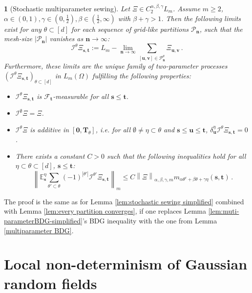 \documentclass[11pt,oneside,english,reqno]{amsart}
\numberwithin{equation}{section}
\numberwithin{figure}{section}
\theoremstyle{plain}
\theoremstyle{definition}
\theoremstyle{remark}
\theoremstyle{plain}
\newtheorem{lem}[thm]{\protect\lemmaname}
\theoremstyle{plain}
\theoremstyle{plain}
\theoremstyle{plain}
\theoremstyle{plain}
\providecommand{\lemmaname}{Lemma}
\newcommand{\cF}{\mathcal{F}}
\newcommand{\cI}{\mathcal{I}}
\newcommand{\cP}{\mathcal{P}}
\newcommand{\EE}{\mathbb{E}}
\newcommand{\bn}{\mathbf{n}}
\newcommand{\bT}{\mathbf{T}}
\newcommand{\boo}{\mathbf{0}}
\newcommand{\bu}{\mathbf{u}}
\newcommand{\bv}{\mathbf{v}}
\newcommand{\bs}{\mathbf{s}}
\newcommand{\bt}{\mathbf{t}}
\newcommand{\norm}[1]{\left\lVert #1\right\rVert}
\newcommand{\abs}[1]{\left\lvert #1\right\rvert}
\begin{document}
\begin{lem}[Stochastic multiparameter sewing]\label{lem:StochSewing}
Let $\Xi\in C_2^{\alpha,\beta,\gamma} L_m$. Assume $m\ge 2$, $\alpha\in(0,1),\gamma\in(0,\frac 12), \beta\in(\frac 12,\infty)$ with $\beta+\gamma>1$. Then the following limits exist for any $\theta\subset[d]$ for each sequence of grid-like partitions $\cP_\bn$, such that the mesh-size $\abs{\cP_\bn}$ vanishes as $\bn\to\infty$:
%
\begin{equation*}
    \cI^{\theta}\Xi_{\bs,\bt} := L_m-\lim_{\bn\to\infty} \sum_{[\bu,\bv]\in \cP^\theta_\bn} \Xi_{\bu,\bv}\,.
\end{equation*}
%
Furthermore, these limits are the unique family of two-parameter processes $(\cI^\theta\Xi_{\bs,\bt})_{\theta\subset[d]}$ in $L_m(\Omega)$ fulfilling the following properties:
%
\begin{itemize}
    \item $\cI^\theta\Xi_{\bs,\bt}$ is $\cF_\bt$-measurable for all $\bs\le\bt$.
    \item $\cI^\emptyset\Xi = \Xi$.
    \item $\cI^{\theta}\Xi$ is additive in $[\boo,\bT_\theta]$, i.e. for all $\emptyset\neq\eta\subset\theta$ and $\bs\le\bu\le\bt$, $\delta^\eta_\bu \cI^\theta\Xi_{\bs,\bt} = 0$.
    \item There exists a constant $C>0$ such that the following inequalities hold for all $\eta\subset\theta\subset[d]$, $\bs\le\bt$:
%
    \begin{equation}\label{ineq:uniqueProperty}
        \norm{\EE^\eta_\bs\sum_{\theta'\subset\theta} (-1)^{\abs{\theta'}} \cI^{\theta'}\Xi_{\bs,\bt}}_m \le C\norm{\Xi}_{\alpha,\beta,\gamma,m}m_{\alpha\theta^c+\beta\theta+\gamma\eta}(\bs,\bt)\,.
    \end{equation}
\end{itemize}
\end{lem}
%
\noindent The proof is the same as for Lemma \ref{lem:stochastic sewing simplified} combined with Lemma \ref{lem:every partition converges}, if one replaces Lemma \ref{lem:muti-parameterBDG-simplified}'s BDG inequality with the one from Lemma \ref{multiparameter BDG}.


\section{Local non-determinism of Gaussian random fields}
\label{LND section}
\end{document}
